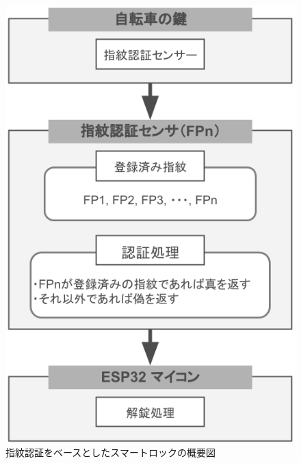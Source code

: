           \begin{figure}[htbp]
            \centering
            \includegraphics[scale=0.46]
            {figures/overallImageOfFingerprintUnlock.png}
            \caption{指紋認証をベースとしたスマートロックの概要図}
            \label{fig:指紋認証をベースとしたスマートロックの概要図}
          \end{figure}
          
